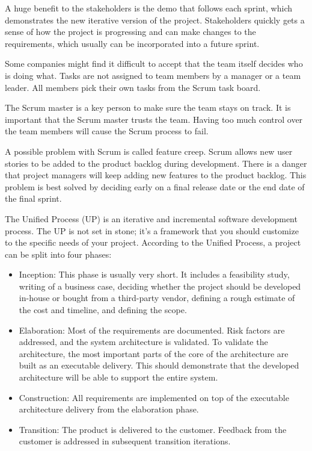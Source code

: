 A huge benefit to the stakeholders is the demo that follows each sprint, which demonstrates the new iterative version of the project. Stakeholders quickly gets a sense of how the project is progressing and can make changes to the requirements, which usually can be incorporated into a future sprint.


Some companies might find it difficult to accept that the team itself decides who is doing what. Tasks are not assigned to team members by a manager or a team leader. All members pick their own tasks from the Scrum task board.

The Scrum master is a key person to make sure the team stays on track. It is important that the Scrum master trusts the team. Having too much control over the team members will cause the Scrum process to fail.

A possible problem with Scrum is called feature creep. Scrum allows new user stories to be added to the product backlog during development. There is a danger that project managers will keep adding new features to the product backlog. This problem is best solved by deciding early on a final release date or the end date of the final sprint.


The Unified Process (UP) is an iterative and incremental software development process. The UP is not set in stone; it’s a framework that you should customize to the specific needs of your project. According to the Unified Process, a project can be split into four phases:

\begin{itemize}
\item
Inception: This phase is usually very short. It includes a feasibility study, writing of a business case, deciding whether the project should be developed in-house or bought from a third-party vendor, defining a rough estimate of the cost and timeline, and defining the scope.

\item
Elaboration: Most of the requirements are documented. Risk factors are addressed, and the system architecture is validated. To validate the architecture, the most important parts of the core of the architecture are built as an executable delivery. This should demonstrate that the developed architecture will be able to support the entire system.

\item
Construction: All requirements are implemented on top of the executable architecture delivery from the elaboration phase.

\item
Transition: The product is delivered to the customer. Feedback from the customer is addressed in subsequent transition iterations.
\end{itemize}

